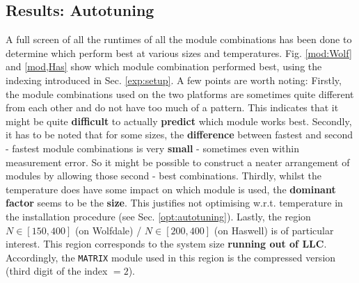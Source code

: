 \documentclass[letterpaper]{article}
\begin{document}
\subsection{Results: Autotuning}
A full screen of all the runtimes of all the module combinations has been done to determine which perform best at various sizes and temperatures. 
\newline Fig. \ref{mod:Wolf} and \ref{mod,Has} show which module combination performed best, using the indexing introduced in Sec. \ref{exp:setup}. A few points are worth noting: \newline
Firstly, the module combinations used on the two platforms are sometimes quite different from each other and do not have too much of a pattern. This indicates that it might be quite \textbf{difficult} to actually \textbf{predict} which module works best. \newline
Secondly, it has to be noted that for some sizes, the \textbf{difference} between fastest and second - fastest module combinations is very \textbf{small} - sometimes even within measurement error. So it might be possible to construct a neater arrangement of modules by allowing those second - best combinations.\newline
Thirdly, whilst the temperature does have some impact on which module is used, the \textbf{dominant factor} seems to be the \textbf{size}. This justifies not optimising w.r.t. temperature in the installation procedure (see Sec. \ref{opt:autotuning}).\newline
Lastly, the region $N \in [150,400]$ (on Wolfdale) / $N \in [200,400]$ (on Haswell) is of particular interest. This region corresponds to the system size \textbf{running out of LLC}. Accordingly, the \texttt{MATRIX} module used in this region is the compressed version (third digit of the index $=2$).
\end{document}
